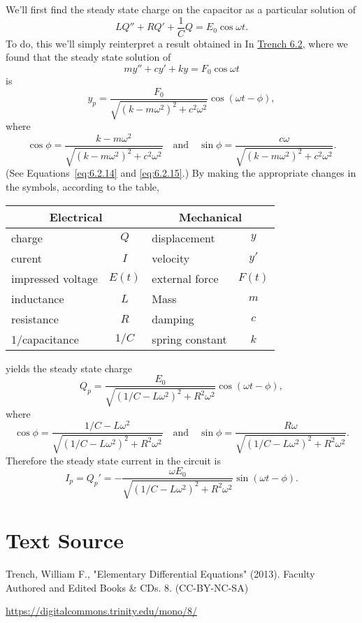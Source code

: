 \documentclass{ximera}
\begin{document}
\begin{example}
\begin{center}
\begin{tikzpicture}[scale=1]
\end{tikzpicture}
\end{center}


\begin{explanation}
We'll first find the steady state charge on the capacitor as
a particular solution of
$$
LQ''+RQ'+\frac{1}{C}Q=E_0\cos\omega t.
$$
To do, this we'll simply reinterpret a result obtained in
In \href{https://ximera.osu.edu/ode/main/springProblemsII/springProblemsII}{Trench 6.2}, where we found that the steady state solution of
$$
my''+cy'+ky=F_0\cos\omega t
$$
is
$$
y_p=\frac{F_0}{\sqrt{(k-m\omega^2)^2+c^2\omega^2}}
\cos(\omega t-\phi),
$$
where
$$
\cos\phi=\frac{k-m\omega^2}{\sqrt
{(k-m\omega^2)^2+c^2\omega^2}}\quad\mbox{and}\quad
\sin\phi=\frac{c\omega}{\sqrt{(k-m\omega^2)^2+c^2\omega^2}}.
$$
(See Equations~\eqref{eq:6.2.14} and \eqref{eq:6.2.15}.) By making the
appropriate changes in the symbols, according to the table,

\begin{center}
\begin{tabular}{|lc|lc|}\hline
\multicolumn{2}{|c|}{\bf Electrical}&
\multicolumn{2}{c|}{\bf Mechanical}\\\hline
charge& $Q$& displacement&$y$\\\hline
curent&$I$&velocity&$y'$\\\hline
impressed voltage&$E(t)$&external force&$F(t)$\\\hline
inductance&$L$&Mass&$m$\\\hline
resistance&$R$&damping&$c$\\\hline
1/capacitance&$1/C$&spring constant&$k$\\\hline
\end{tabular}
\end{center}

yields the steady state charge
$$
Q_p=\frac{E_0}{\sqrt{(1/C-L\omega^2)^2+R^2\omega^2}}\cos(\omega
t-\phi),
$$
where
$$
\cos\phi=\frac{1/C-L\omega^2}{\sqrt{(1/C-L\omega^2)^2+R^2\omega^2}}
\quad\mbox{and}\quad
\sin\phi=\frac{R\omega}{\sqrt{(1/C-L\omega^2)^2+R^2\omega^2}}.
$$
 Therefore the steady state current in the circuit
is
$$
I_p=Q_p'=
-\frac{\omega E_0}{\sqrt{(1/C-L\omega^2)^2+R^2\omega^2}}\sin(\omega
t-\phi).
$$
\end{explanation}
\end{example}
\section*{Text Source}
Trench, William F., "Elementary Differential Equations" (2013). Faculty Authored and Edited Books \& CDs. 8. (CC-BY-NC-SA)

\href{https://digitalcommons.trinity.edu/mono/8/}{https://digitalcommons.trinity.edu/mono/8/}
\end{document}
